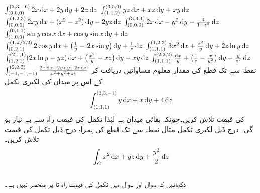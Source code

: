 \(\int_{(0,0,0)}^{(2,3,-6)}2x\dif x+2y\dif y+2z\dif z\)
\(\int_{(1,1,2)}^{(3,5,0)}yz\dif x+xz\dif y+xy\dif z\)
\(\int_{(0,0,0)}^{(1,2,3)}2xy\dif x+(x^2-z^2)\dif y-2yz\dif z\)
\(\int_{(0,0,0)}^{(3,3,1)}2x\dif x-y^2\dif y-\frac{4}{1+z^2}\dif z\)
\(\int_{(1,0,0)}^{(0,1,1)}\sin y\cos x\dif x+\cos y\sin x\dif y+\dif z\)
\(\int_{(0,2,1)}^{(1,\pi/2,2)}2\cos y\dif x+\big(\frac{1}{y}-2x\sin y\big)\dif y+\frac{1}{z}\dif z\)
\(\int_{(1,1,1)}^{(1,2,3)}3x^2\dif x+\frac{z^2}{y}\dif y+2z\ln y\dif z\)
\(\int_{(1,2,1)}^{(2,1,1)}(2x\ln y-yz)\dif x+\big(\frac{x^2}{y}-xz\big)\dif y-xy\dif z\)
\(\int_{(1,1,1)}^{(2,2,2)}\frac{\dif x}{y}+\big(\frac{1}{z}-\frac{x}{y^2}\big)\dif y-\frac{y}{z^2}\dif z\)
\(\int_{(-1,-1,-1)}^{(2,2,2)}\frac{2x\dif x+2y\dif y+2z\dif z}{x^2+y^2+z^2}\)
نقطہ  سے  تک قطع کی مقدار معلوم مساواتیں دریافت کر کے اس پر میدان  کی لکیری تکمل
\begin{align*}
\int_{(1,1,1)}^{(2,3,-1)} y\dif x+x\dif y+4\dif z
\end{align*}
 کی قیمت تلاش کریں۔چونکہ  بقائی میدان ہے لہٰذا تکمل کی قیمت راہ سے بے نیاز ہو گی۔
درج ذیل لکیری تکمل مثال 
نقطہ  سے  تک  قطع  کی ہمراہ درج ذیل تکمل کی قیمت تلاش کریں۔
\begin{align*}
\int_C x^2\dif x+yz\dif y+\frac{y^2}{2}\dif z
\end{align*}
\\
دکھائیں کہ سوال  اور سوال  میں  تکمل کی قیمت  راہ  تا  پر منحصر نہیں ہے۔

